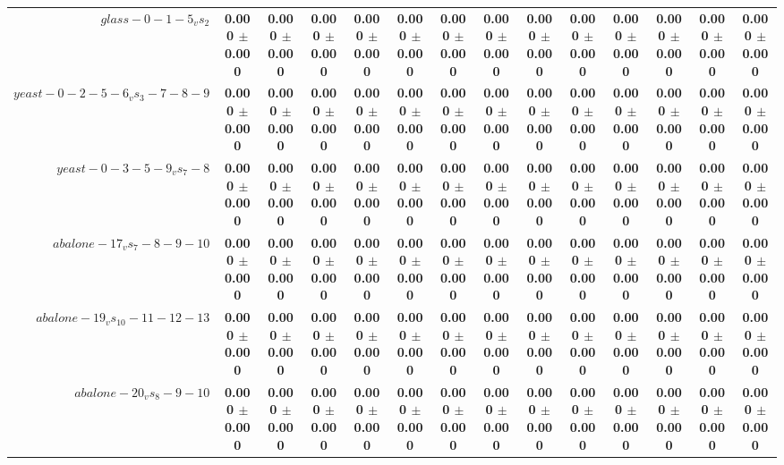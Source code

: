 \begin{table}[!ht]
{\begin{tabular}{r c c c c c c c c c c c c c}
$glass-0-1-5_vs_2$ & \textbf{0.000 $\pm$ 0.000} & \textbf{0.000 $\pm$ 0.000} & \textbf{0.000 $\pm$ 0.000} & \textbf{0.000 $\pm$ 0.000} & \textbf{0.000 $\pm$ 0.000} & \textbf{0.000 $\pm$ 0.000} & \textbf{0.000 $\pm$ 0.000} & \textbf{0.000 $\pm$ 0.000} & \textbf{0.000 $\pm$ 0.000} & \textbf{0.000 $\pm$ 0.000} & \textbf{0.000 $\pm$ 0.000} & \textbf{0.000 $\pm$ 0.000} & \textbf{0.000 $\pm$ 0.000} \\
$yeast-0-2-5-6_vs_3-7-8-9$ & \textbf{0.000 $\pm$ 0.000} & \textbf{0.000 $\pm$ 0.000} & \textbf{0.000 $\pm$ 0.000} & \textbf{0.000 $\pm$ 0.000} & \textbf{0.000 $\pm$ 0.000} & \textbf{0.000 $\pm$ 0.000} & \textbf{0.000 $\pm$ 0.000} & \textbf{0.000 $\pm$ 0.000} & \textbf{0.000 $\pm$ 0.000} & \textbf{0.000 $\pm$ 0.000} & \textbf{0.000 $\pm$ 0.000} & \textbf{0.000 $\pm$ 0.000} & \textbf{0.000 $\pm$ 0.000} \\
$yeast-0-3-5-9_vs_7-8$ & \textbf{0.000 $\pm$ 0.000} & \textbf{0.000 $\pm$ 0.000} & \textbf{0.000 $\pm$ 0.000} & \textbf{0.000 $\pm$ 0.000} & \textbf{0.000 $\pm$ 0.000} & \textbf{0.000 $\pm$ 0.000} & \textbf{0.000 $\pm$ 0.000} & \textbf{0.000 $\pm$ 0.000} & \textbf{0.000 $\pm$ 0.000} & \textbf{0.000 $\pm$ 0.000} & \textbf{0.000 $\pm$ 0.000} & \textbf{0.000 $\pm$ 0.000} & \textbf{0.000 $\pm$ 0.000} \\
$abalone-17_vs_7-8-9-10$ & \textbf{0.000 $\pm$ 0.000} & \textbf{0.000 $\pm$ 0.000} & \textbf{0.000 $\pm$ 0.000} & \textbf{0.000 $\pm$ 0.000} & \textbf{0.000 $\pm$ 0.000} & \textbf{0.000 $\pm$ 0.000} & \textbf{0.000 $\pm$ 0.000} & \textbf{0.000 $\pm$ 0.000} & \textbf{0.000 $\pm$ 0.000} & \textbf{0.000 $\pm$ 0.000} & \textbf{0.000 $\pm$ 0.000} & \textbf{0.000 $\pm$ 0.000} & \textbf{0.000 $\pm$ 0.000} \\
$abalone-19_vs_10-11-12-13$ & \textbf{0.000 $\pm$ 0.000} & \textbf{0.000 $\pm$ 0.000} & \textbf{0.000 $\pm$ 0.000} & \textbf{0.000 $\pm$ 0.000} & \textbf{0.000 $\pm$ 0.000} & \textbf{0.000 $\pm$ 0.000} & \textbf{0.000 $\pm$ 0.000} & \textbf{0.000 $\pm$ 0.000} & \textbf{0.000 $\pm$ 0.000} & \textbf{0.000 $\pm$ 0.000} & \textbf{0.000 $\pm$ 0.000} & \textbf{0.000 $\pm$ 0.000} & \textbf{0.000 $\pm$ 0.000} \\
$abalone-20_vs_8-9-10$ & \textbf{0.000 $\pm$ 0.000} & \textbf{0.000 $\pm$ 0.000} & \textbf{0.000 $\pm$ 0.000} & \textbf{0.000 $\pm$ 0.000} & \textbf{0.000 $\pm$ 0.000} & \textbf{0.000 $\pm$ 0.000} & \textbf{0.000 $\pm$ 0.000} & \textbf{0.000 $\pm$ 0.000} & \textbf{0.000 $\pm$ 0.000} & \textbf{0.000 $\pm$ 0.000} & \textbf{0.000 $\pm$ 0.000} & \textbf{0.000 $\pm$ 0.000} & \textbf{0.000 $\pm$ 0.000} \\

\end{tabular}}
\end{table}
